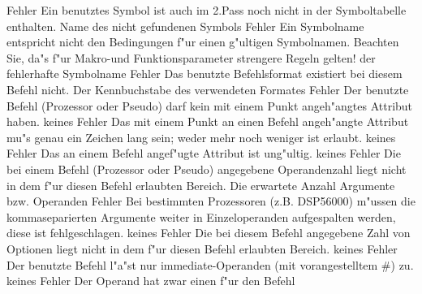 \documentclass[12pt,a4paper,twoside]{report}
\begin{document}
\begin{description}
               {Fehler}
               {Ein benutztes Symbol ist auch im 2.Pass noch
                nicht in der Symboltabelle enthalten.}
               {Name des nicht gefundenen Symbols}
               {Fehler}
               {Ein Symbolname entspricht nicht den Bedingungen
                f"ur einen g"ultigen Symbolnamen.  Beachten Sie, da"s f"ur
                Makro-und Funktionsparameter strengere Regeln gelten!}
               {der fehlerhafte Symbolname}
               {Fehler}
               {Das benutzte Befehlsformat existiert bei diesem
                Befehl nicht.}
               {Der Kennbuchstabe des verwendeten Formates}
               {Fehler}
               {Der benutzte Befehl (Prozessor oder Pseudo) darf
                kein mit einem Punkt angeh"angtes Attribut haben.}
               {keines}
               {Fehler}
               {Das mit einem Punkt an einen Befehl angeh"angte
                Attribut mu"s genau ein Zeichen lang sein; weder mehr noch
                weniger ist erlaubt.}
               {keines}
               {Fehler}
               {Das an einem Befehl angef"ugte Attribut ist ung"ultig.}
               {keines}
               {Fehler}
               {Die bei einem Befehl (Prozessor oder Pseudo)
                angegebene Operandenzahl liegt nicht in dem f"ur diesen
                Befehl erlaubten Bereich.}
               {Die erwartete Anzahl Argumente bzw. Operanden}
               {Fehler}
               {Bei bestimmten Prozessoren (z.B. DSP56000)
                m"ussen die kommaseparierten Argumente weiter in
                Einzeloperanden aufgespalten werden, diese ist
                fehlgeschlagen.}
               {keines}
               {Fehler}
               {Die bei diesem Befehl angegebene Zahl
	        von Optionen liegt nicht in dem f"ur diesen
                Befehl erlaubten Bereich.}
               {keines}
               {Fehler}
               {Der benutzte Befehl l"a"st nur
                immediate-Operanden (mit vorangestelltem \#) zu.}
               {keines}
               {Fehler}
               {Der Operand hat zwar einen f"ur den Befehl
}
\end{description}
\end{document}

